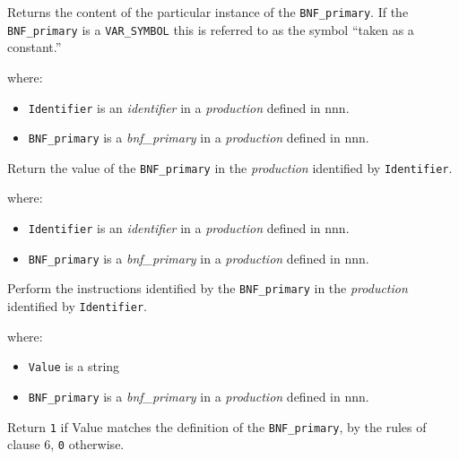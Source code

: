 Returns the content of the particular instance of the
\texttt{BNF\_primary}. If the \texttt{BNF\_primary} is a
\texttt{VAR\_SYMBOL} this is referred to as the symbol ``taken as a
constant.''



where:

\begin{itemize}
\tightlist
\item
  \texttt{Identifier} is an \emph{identifier} in a \emph{production}
  defined in nnn.
\item
  \texttt{BNF\_primary} is a \emph{bnf\_primary} in a \emph{production}
  defined in nnn.
\end{itemize}

Return the value of the \texttt{BNF\_primary} in the \emph{production}
identified by \texttt{Identifier}.



where:

\begin{itemize}
\tightlist
\item
  \texttt{Identifier} is an \emph{identifier} in a \emph{production}
  defined in nnn.
\item
  \texttt{BNF\_primary} is a \emph{bnf\_primary} in a \emph{production}
  defined in nnn.
\end{itemize}

Perform the instructions identified by the \texttt{BNF\_primary} in the
\emph{production} identified by \texttt{Identifier}.



where:

\begin{itemize}
\tightlist
\item
  \texttt{Value} is a string
\item
  \texttt{BNF\_primary} is a \emph{bnf\_primary} in a \emph{production}
  defined in nnn.
\end{itemize}

Return \texttt{\textquotesingle{}1\textquotesingle{}} if Value matches
the definition of the \texttt{BNF\_primary}, by the rules of clause 6,
\texttt{\textquotesingle{}0\textquotesingle{}} otherwise.

